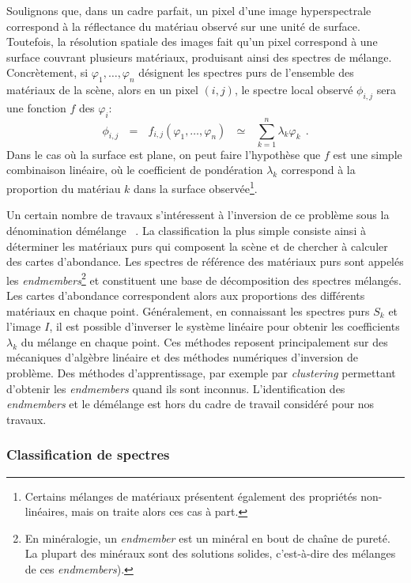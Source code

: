 Soulignons que, dans un cadre parfait, un pixel d'une image hyperspectrale correspond à la réflectance du matériau observé sur une unité de surface. Toutefois, la résolution spatiale des images fait qu'un pixel correspond à une surface couvrant plusieurs matériaux, produisant ainsi des spectres de mélange. Concrètement, si $\varphi_1, \dots, \varphi_n$ désignent les spectres purs de l'ensemble des matériaux de la scène, alors en un pixel $(i,j)$, le spectre local observé $\phi_{i,j}$ sera une fonction $f$ des $\varphi_i$:
\begin{equation}
  \phi_{i,j}~~~=~~~f_{i,j}(\varphi_1, \dots, \varphi_n)~~~\simeq~~~\sum_{k = 1}^n \lambda_k \varphi_k~~.
\end{equation}
Dans le cas où la surface est plane, on peut faire l'hypothèse que $f$ est une simple combinaison linéaire, où le coefficient de pondération $\lambda_k$ correspond à la proportion du matériau $k$ dans la surface observée\footnote{Certains mélanges de matériaux présentent également des propriétés non-linéaires, mais on traite alors ces cas à part.}.

Un certain nombre de travaux s'intéressent à l'inversion de ce problème sous la dénomination \og démélange \fg~\cite{parra_unmixing_1999}. La classification la plus simple consiste ainsi à déterminer les matériaux purs qui composent la scène et de chercher à calculer des cartes d'abondance. Les spectres de référence des matériaux purs sont appelés les \emph{endmembers}\footnote{En minéralogie, un \emph{endmember} est un minéral en bout de chaîne de pureté. La plupart des minéraux sont des solutions solides, c'est-à-dire des mélanges de ces \emph{endmembers}).} et constituent une base de décomposition des spectres mélangés. Les cartes d'abondance correspondent alors aux proportions des différents matériaux en chaque point. Généralement, en connaissant les spectres purs $S_k$ et l'image $I$, il est possible d'inverser le système linéaire pour obtenir les coefficients $\lambda_k$ du mélange en chaque point. Ces méthodes reposent principalement sur des mécaniques d'algèbre linéaire et des méthodes numériques d'inversion de problème. Des méthodes d'apprentissage, par exemple par \emph{clustering} permettant d'obtenir les \emph{endmembers} quand ils sont inconnus. L'identification des \emph{endmembers} et le démélange est hors du cadre de travail considéré pour nos travaux.

\subsubsection{Classification de spectres}

